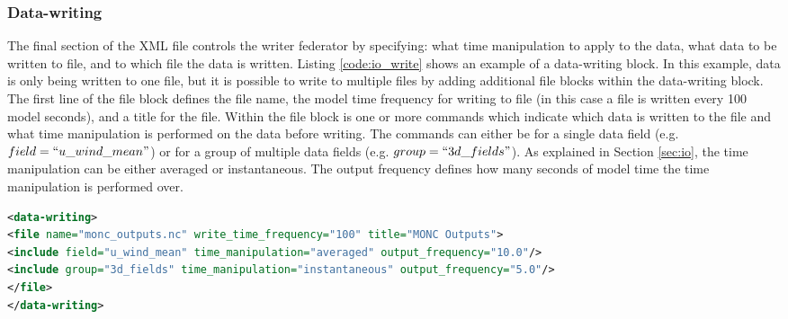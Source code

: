 \subsubsection{Data-writing}
The final section of the XML file controls the writer federator by specifying: what time manipulation to apply to the data, what data to be written to file, and to which file the data is written. Listing \ref{code:io_write} shows an example of a data-writing block. In this example, data is only being written to one file, but it is possible to write to multiple files by adding additional file blocks within the data-writing block. The first line of the file block defines the file name, the model time frequency for writing to file (in this case a file is written every 100 model seconds), and a title for the file. Within the file block is one or more commands which indicate which data is written to the file and what time manipulation is performed on the data before writing. The commands can either be for a single data field (e.g. $field=``u\_wind\_mean"$) or for a group of multiple data fields (e.g. $group=``3d\_fields"$). As explained in Section \ref{sec:io}, the time manipulation can be either averaged or instantaneous. The output frequency defines how many seconds of model time the time manipulation is performed over. \citep{brown2018,moncCode}

\begin{lstlisting}[language=XML,caption=Example of MONC I/O data-writing block for writing mean u wind and the 3d\_fields group to the monc\_output.nc file.,label={code:io_write},belowskip=-1cm]
<data-writing>
<file name="monc_outputs.nc" write_time_frequency="100" title="MONC Outputs">
<include field="u_wind_mean" time_manipulation="averaged" output_frequency="10.0"/>
<include group="3d_fields" time_manipulation="instantaneous" output_frequency="5.0"/>
</file>
</data-writing>
\end{lstlisting}

